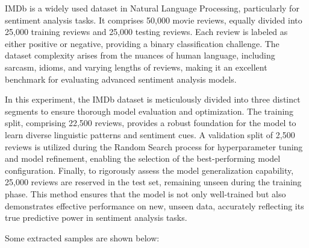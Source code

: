 \documentclass[12pt,a4paper]{report}
\begin{document}
IMDb is a widely used dataset in Natural Language Processing, particularly for sentiment analysis tasks. It comprises 50,000 movie reviews, equally divided into 25,000 training reviews and 25,000 testing reviews. Each review is labeled as either positive or negative, providing a binary classification challenge. The dataset complexity arises from the nuances of human language, including sarcasm, idioms, and varying lengths of reviews, making it an excellent benchmark for evaluating advanced sentiment analysis models.

In this experiment, the IMDb dataset is meticulously divided into three distinct segments to ensure thorough model evaluation and optimization. The training split, comprising 22,500 reviews, provides a robust foundation for the model to learn diverse linguistic patterns and sentiment cues. A validation split of 2,500 reviews is utilized during the Random Search process for hyperparameter tuning and model refinement, enabling the selection of the best-performing model configuration. Finally, to rigorously assess the model generalization capability, 25,000 reviews are reserved in the test set, remaining unseen during the training phase. This method ensures that the model is not only well-trained but also demonstrates effective performance on new, unseen data, accurately reflecting its true predictive power in sentiment analysis tasks.

Some extracted samples are shown below:
\end{document}
